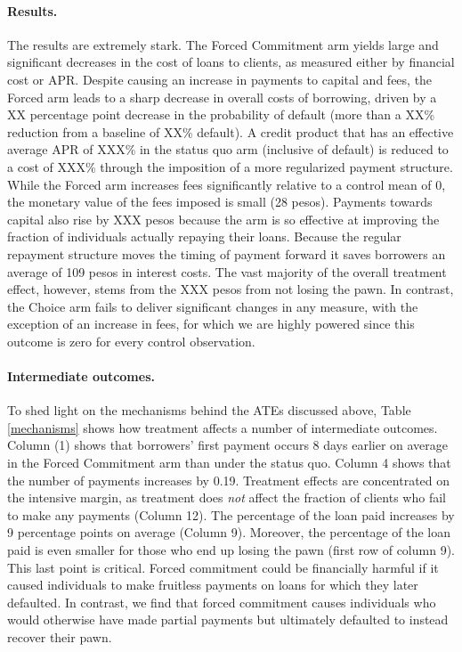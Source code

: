 \documentclass[oneside,11pt]{article}
\begin{document}
\paragraph{Results.} The results are extremely stark.
The Forced Commitment arm yields large and significant decreases in the cost of loans to clients, as measured either by financial cost or APR. 
Despite causing an increase in payments to capital and fees, the Forced arm leads to a sharp decrease in overall costs of borrowing, driven by a XX percentage point decrease in the probability of default (more than a XX\% reduction from a baseline of XX\% default).  
A credit product that has an effective average APR of XXX\% in the status quo arm (inclusive of default) is reduced to a cost of XXX\% through the imposition of a more regularized payment structure.  
While the Forced arm increases fees significantly relative to a control mean of 0, the monetary value of the fees imposed is small (28 pesos).  
Payments towards capital also rise by XXX pesos because the arm is so effective at improving the fraction of individuals actually repaying their loans.  
Because the regular repayment structure moves the timing of payment forward it saves borrowers an average of 109 pesos in interest costs.  
The vast majority of the overall treatment effect, however, stems from the XXX pesos from not losing the pawn. 
In contrast, the Choice arm fails to deliver significant changes in any measure, with the exception of an increase in fees, for which we are highly powered since this outcome is zero for every control observation.  

\paragraph{Intermediate outcomes.} To shed light on the mechanisms behind the ATEs discussed above, Table \ref{mechanisms} shows how treatment affects a number of intermediate outcomes. 
Column (1) shows that borrowers' first payment occurs 8 days earlier on average in the Forced Commitment arm than under the status quo.
Column 4 shows that the number of payments increases by 0.19.
Treatment effects are concentrated on the intensive margin, as treatment does \emph{not} affect the fraction of clients who fail to make any payments (Column 12). 
The percentage of the loan paid increases by 9 percentage points on average (Column 9). 
Moreover, the percentage of the loan paid is even smaller for those who end up losing the pawn (first row of column 9). 
This last point is critical. 
Forced commitment could be financially harmful if it caused individuals to make fruitless payments on loans for which they later defaulted. 
In contrast, we find that forced commitment causes individuals who would otherwise have made partial payments but ultimately defaulted to instead recover their pawn.
\end{document}

